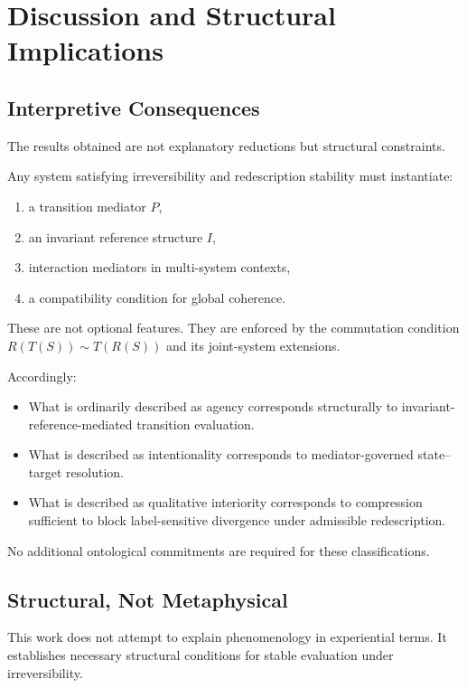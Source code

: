 \documentclass[11pt]{article}
\theoremstyle{definition}
\begin{document}
\section{Discussion and Structural Implications}

\subsection{Interpretive Consequences}

The results obtained are not explanatory reductions but structural constraints.

Any system satisfying irreversibility and redescription stability must instantiate:

\begin{enumerate}[label=(\roman*)]
    \item a transition mediator $P$,
    \item an invariant reference structure $I$,
    \item interaction mediators in multi-system contexts,
    \item a compatibility condition for global coherence.
\end{enumerate}

These are not optional features. They are enforced by the commutation condition
\(
R(T(S)) \sim T(R(S))
\)
and its joint-system extensions.

Accordingly:

\begin{itemize}
    \item What is ordinarily described as agency corresponds structurally to invariant-reference-mediated transition evaluation.
    \item What is described as intentionality corresponds to mediator-governed state--target resolution.
    \item What is described as qualitative interiority corresponds to compression sufficient to block label-sensitive divergence under admissible redescription.
\end{itemize}

No additional ontological commitments are required for these classifications.

\subsection{Structural, Not Metaphysical}

This work does not attempt to explain phenomenology in experiential terms.
It establishes necessary structural conditions for stable evaluation under irreversibility.
\end{document}
